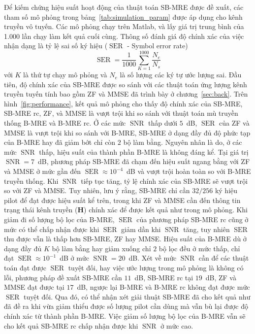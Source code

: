 Để kiếm chứng hiệu suất hoạt động của thuật toán SB-MRE được đề xuất, các tham số mô phỏng trong bảng~\ref{tab:simulation_param} được áp dụng cho kênh truyền vô tuyến. Các mô phỏng chạy trên Matlab, và lấy giá trị trung bình của 1.000 lần chạy làm kết quả cuối cùng.
Thông số đánh giá độ chính xác của việc nhận dạng là tỷ lệ sai số ký hiệu ($\operatorname{SER}$ - Symbol error rate)
\begin{equation}
    \operatorname{SER} = \frac{1}{1000} \sum_{K=1}^{1000} \frac{N_e}{N_s}
\end{equation}
với $K$ là thứ tự chạy mô phỏng và $N_e$ là số lượng các ký tự ước lượng sai. Đầu tiên, độ chính xác của SB-MRE được so sánh với các thuật toán ứng lượng kênh truyền tuyến tính bao gồm ZF và MMSE đã trình bày ở chương~\ref{sec:back}. Trên hình~\ref{fig:performance}, kết quả mô phỏng cho thấy độ chính xác của SB-MRE, SB-MRE rc, ZF, và MMSE là vượt trội khi so sánh với thuật toán mù truyền thống B-MRE và B-MRE rc. Ở các mức $\operatorname{SNR}$ thấp dưới $5$~dB, $\operatorname{SER}$ của ZF và MMSE là vượt trội khi so sánh với B-MRE, SB-MRE ở dạng đầy đủ độ phức tạp của B-MRE hay đã giảm bớt chỉ còn $2$ bộ làm bằng. Nguyên nhân là do, ở các mức $\operatorname{SNR}$ thấp, hiệu suất của thành phần B-MRE là không đáng kể. Tại giá trị $\operatorname{SNR}=7$~dB, phương pháp SB-MRE đã chạm đến hiệu suất ngang bằng với ZF và MMSE ở mức gần đến $\operatorname{SER}\approx 10^{-4}$~dB và vượt trội hoàn toàn so với B-MRE truyền thống. Khi $\operatorname{SNR}$ tiếp tục tăng, tỷ lệ chính xác của SB-MRE sẽ vượt trội so với ZF và MMSE. Tuy nhiên, lưu ý rằng, SB-MRE chỉ cần $32/256$ ký hiệu pilot để đạt được hiệu suất kể trên, trong khi ZF và MMSE cần đến thông tin trạng thái kênh truyền ($\mathbf{H}$) chính xác để được kết quả như trong mô phỏng. Khi giảm đi số lượng bộ lọc của B-MRE, $\operatorname{SER}$ của phương pháp SB-MRE rc cũng ở mức có thể chấp nhận được khi $\operatorname{SER}$ giảm dần khi $\operatorname{SNR}$ tăng, tuy nhiên $\operatorname{SER}$ thu được vẫn là thấp hơn SB-MRE, ZF hay MMSE. Hiệu suất của B-MRE dù ở dạng đầy đủ $K$ bộ làm bằng hay giảm xuống chỉ $2$ bộ lọc đều ở mức thấp, chỉ đạt $\operatorname{SER}\approx 10^{-1}$~dB ở mức $\operatorname{SNR}=20$~dB. Xét về mức $\operatorname{SNR}$ cần để các thuật toán đạt được $\operatorname{SER}$ tuyệt đối, hay việc ước lượng trong mô phỏng là không có lỗi, phương pháp đề xuất SB-MRE cần $11$~dB, SB-MRE rc tại $19$~dB, ZF và MMSE đạt được tại $17$~dB, ngược lại B-MRE và B-MRE rc không đạt được mức $\operatorname{SER}$ tuyệt đối. Qua đó, có thể nhận xét giải thuật SB-MRE đã cho kết quả như đã đề ra khi vừa giảm thiểu được số lượng pilot cần dùng mà vẫn bù lại được độ chính xác từ thành phần B-MRE. Việc giảm số lượng bộ lọc của B-MRE vẫn sẽ cho kết quả SB-MRE rc chấp nhận được khi $\operatorname{SNR}$ ở mức cao.

